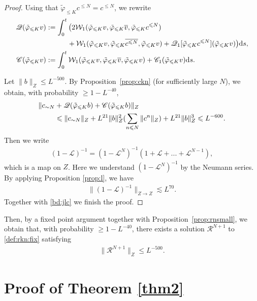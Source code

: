 \documentclass[UTF-8,reqno]{amsart}
\numberwithin{equation}{section}
\theoremstyle{definition}
\def\dif{{\mathord{{\rm d}}}}
\def\geq{\geqslant}
\def\leq{\leqslant}
\def\dif{{\mathord{{\rm d}}}}
\def\geq{\geqslant}
\def\leq{\leqslant}
\begin{document}
\begin{proof}
 Using that $\tilde\varphi_{\leq K}c^{\leq N}=c^{\leq N}$, we rewrite \begin{align*} 
\mathscr{Q}(\tilde\varphi_{\leq K}v)&:=\int_0^t \big(2\mathcal{W}_1(\tilde\varphi_{\leq K}v,\tilde\varphi_{\leq K}\overline{v}, \tilde\varphi_{\leq K}c^{\leq N})\\
&\quad\quad\quad +\mathcal{W}_1(\tilde\varphi_{\leq K}v, \tilde\varphi_{\leq K}\overline{c^{\leq N}},\tilde\varphi_{\leq K} v)+\mathscr{Q}_1[\tilde\varphi_{\leq K}c^{\leq N}](\tilde\varphi_{\leq K}v)\big)\dif s,\\
\mathscr{C}(\tilde\varphi_{\leq K}v)&:=\int_0^t \mathcal{W}_1(\tilde\varphi_{\leq K}v, \tilde\varphi_{\leq K}\overline{v}, \tilde\varphi_{\leq K}v)+\mathscr{C}_1(\tilde\varphi_{\leq K}v)\dif s.
\end{align*} 

Let $\|b\|_{Z}\leq L^{-500}$. By Proposition~\ref{prop:ckn} (for sufficiently large $N$), we obtain, with probability   $\geq 1-L^{-40}$,
\begin{align}
   \|c_{\sim N}& +\mathscr{Q}(\tilde\varphi_{\leq K}b)+\mathscr{C}(\tilde\varphi_{\leq K}b)\|_Z\notag\\
   &\leq \|c_{\sim N}\|_Z + L^{21}\|b\|_Z^2(\sum_{n\leq N}\|c^n\|_Z)+ L^{21}\|b\|_Z^3\leq  L^{-600}.\label{bd:jlc}
\end{align}
Then we write  
\begin{align*}
    (1 -\mathscr{L})^{-1} =(1-\mathscr{L}^N)^{-1}(1+\mathscr{L} +...+\mathscr{L}^{N-1}),
\end{align*}
which is a map on $Z$. Here we understand  $(1-\mathscr{L}^N)^{-1}$  by the Neumann series. By applying Proposition \ref{prop:l}, we have 
\begin{align}\label{bd:1-l}
    \| (1 -\mathscr{L})^{-1} \|_{Z\to Z} \lesssim L^{70}.
\end{align}
Together with \eqref{bd:jlc} we finish the proof.
\end{proof}
Then, by a fixed point argument together with Proposition~\ref{prop:rnsmall}, we obtain that, with probability   $\geq 1 - L^{-40}$, there exists a solution $\mathcal{R}^{N+1}$ to \eqref{def:rkn:fix} satisfying  \begin{align}
     \|\mathcal{R}^{N+1}\|_{ Z} \leq  L^{-500}.\label{bd:mathcalr}
\end{align} 


\section{Proof of Theorem \ref{thm2}}\label{sec:proof of theorem 2} 
\end{document}
